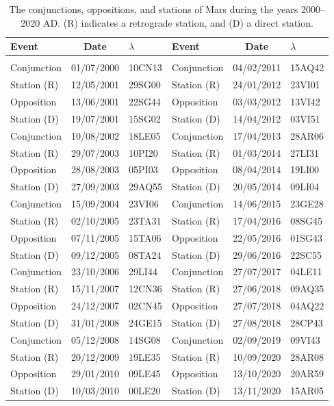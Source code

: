 \clearpage
\begin{table}[!h]\centering
\vspace{0.25cm}
\begin{tabular}{lcl|lcl}
Event & Date & $\lambda$ & Event & Date & $\lambda$  \\\hline
&&\\[-1.75ex]
Conjunction & 01/07/2000 & 10CN13 &Conjunction & 04/02/2011 & 15AQ42\\
Station (R) & 12/05/2001 & 29SG00 & Station (R) & 24/01/2012 & 23VI01\\
Opposition & 13/06/2001 & 22SG44 & Opposition & 03/03/2012 & 13VI42\\
Station (D) & 19/07/2001 & 15SG02 & Station (D) & 14/04/2012 & 03VI51\\
Conjunction & 10/08/2002 & 18LE05 & Conjunction & 17/04/2013 & 28AR06\\
Station (R) & 29/07/2003 & 10PI20 & Station (R) & 01/03/2014 & 27LI31\\
Opposition & 28/08/2003 & 05PI03 & Opposition & 08/04/2014 & 19LI00\\
Station (D) & 27/09/2003 & 29AQ55 & Station (D) & 20/05/2014 & 09LI04\\
Conjunction & 15/09/2004 & 23VI06 & Conjunction & 14/06/2015 & 23GE28\\
Station (R) & 02/10/2005 & 23TA31 & Station (R) & 17/04/2016 & 08SG45\\
Opposition & 07/11/2005 & 15TA06 & Opposition & 22/05/2016 & 01SG43\\
Station (D) & 09/12/2005 & 08TA24 & Station (D) & 29/06/2016 & 22SC55\\
Conjunction & 23/10/2006 & 29LI44 & Conjunction & 27/07/2017 & 04LE11\\
Station (R) & 15/11/2007 & 12CN36 & Station (R) & 27/06/2018 & 09AQ35\\
Opposition & 24/12/2007 & 02CN45 & Opposition & 27/07/2018 & 04AQ22\\
Station (D) & 31/01/2008 & 24GE15 & Station (D) & 27/08/2018 & 28CP43\\
Conjunction & 05/12/2008 & 14SG08 & Conjunction & 02/09/2019 & 09VI43\\
Station (R) & 20/12/2009 & 19LE35 & Station (R) & 10/09/2020 & 28AR08\\
Opposition & 29/01/2010 & 09LE45 & Opposition & 13/10/2020 & 20AR59\\
Station (D) & 10/03/2010 & 00LE20& Station (D) & 13/11/2020 & 15AR05\\
\end{tabular}
\caption{The conjunctions, oppositions, and stations of Mars
during the years 2000--2020 AD. (R) indicates a retrograde station, and (D)
a direct station.}\label{vtmars}
\end{table}

